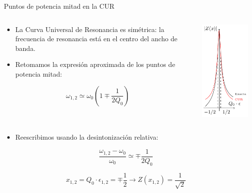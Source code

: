 \documentclass[aspectratio=169, usenames,svgnames,dvipsnames]{beamer}
\begin{document}
\begin{frame}[label={sec:org76fe0c2}]{Puntos de potencia mitad en la CUR}
\begin{columns}
\begin{column}{0.7\columnwidth}
\begin{itemize}
\item La Curva Universal de Resonancia es simétrica: la frecuencia de resonancia está en el centro del ancho de banda.
\item Retomamos la expresión aproximada de los puntos de potencia mitad:
\end{itemize}
\[
  \omega_{1,2} \simeq \omega_0 (1 \mp \frac{1}{2Q_0})
\]
\end{column}

\begin{column}{0.3\columnwidth}
\begin{center}
\includegraphics[height=0.7\textheight]{../figs/CUR.pdf}
\end{center}
\end{column}
\end{columns}

\begin{itemize}
\item Reescribimos usando la desintonización relativa:
\end{itemize}
\[
  \frac{\omega_{1,2} - \omega_0}{\omega_0} \simeq \mp \frac{1}{2Q_0}
\]

\[
  \boxed{x_{1,2} = Q_0 \cdot \epsilon_{1,2} = \mp \frac{1}{2}} \rightarrow Z(x_{1,2}) = \frac{1}{\sqrt{2}}
\]
\end{frame}
\end{document}
